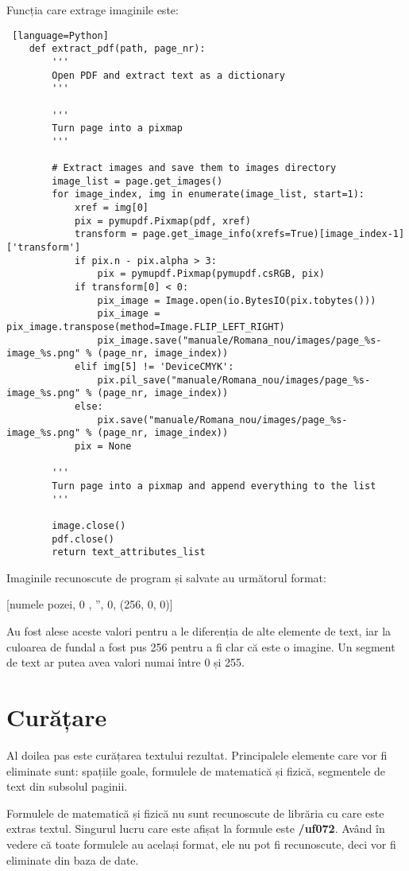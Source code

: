 Funcția care extrage imaginile este:
\vspace{1em}
\begin{lstlisting} [language=Python]
	def extract_pdf(path, page_nr):
		'''
		Open PDF and extract text as a dictionary
		'''
		
		'''
		Turn page into a pixmap
		'''
	
		# Extract images and save them to images directory
		image_list = page.get_images()
		for image_index, img in enumerate(image_list, start=1):
			xref = img[0]
			pix = pymupdf.Pixmap(pdf, xref)
			transform = page.get_image_info(xrefs=True)[image_index-1]['transform']
			if pix.n - pix.alpha > 3:
				pix = pymupdf.Pixmap(pymupdf.csRGB, pix)
			if transform[0] < 0:
				pix_image = Image.open(io.BytesIO(pix.tobytes()))
				pix_image = pix_image.transpose(method=Image.FLIP_LEFT_RIGHT)
				pix_image.save("manuale/Romana_nou/images/page_%s-image_%s.png" % (page_nr, image_index))
			elif img[5] != 'DeviceCMYK':
				pix.pil_save("manuale/Romana_nou/images/page_%s-image_%s.png" % (page_nr, image_index))
			else:
				pix.save("manuale/Romana_nou/images/page_%s-image_%s.png" % (page_nr, image_index))
			pix = None
		
		'''
		Turn page into a pixmap and append everything to the list
		'''
		
		image.close()
		pdf.close()
		return text_attributes_list
\end{lstlisting}
\vspace{1em}

Imaginile recunoscute de program și salvate au următorul format:

\begin{center}
	[numele pozei, 0 , '', 0, (256, 0, 0)]
\end{center}

Au fost alese aceste valori pentru a le diferenția de alte elemente de text, iar la culoarea de fundal a fost pus 256 pentru a fi clar că este o imagine. Un segment de text ar putea avea valori numai între 0 și 255.


\section{Curățare}

Al doilea pas este curățarea textului rezultat. Principalele elemente care vor fi eliminate sunt: spațiile goale, formulele de matematică și fizică, segmentele de text din subsolul paginii.

Formulele de matematică și fizică nu sunt recunoscute de librăria cu care este extras textul. Singurul lucru care este afișat la formule este \textbf{/uf072}. Având în vedere că toate formulele au același format, ele nu pot fi recunoscute, deci vor fi eliminate din baza de date.

